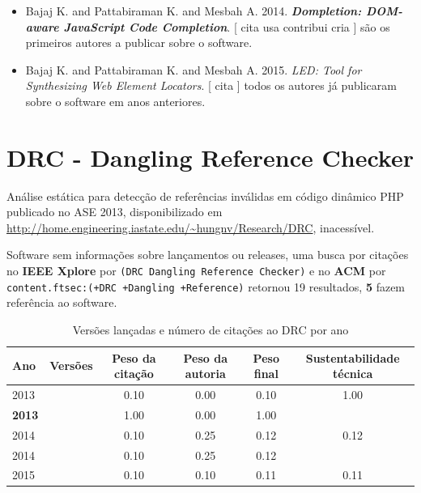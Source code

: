 \begin{itemize}
\item Bajaj K. and Pattabiraman K. and Mesbah A.
      2014.
        \textbf{\textit{ Dompletion: DOM-aware JavaScript Code Completion}}.
      [
          cita
          usa
          contribui
          cria
      ]
são os primeiros autores a publicar sobre o software.
\item Bajaj K. and Pattabiraman K. and Mesbah A.
      2015.
        \textit{ LED: Tool for Synthesizing Web Element Locators}.
      [
          cita
      ]
todos os autores já publicaram sobre o software em anos anteriores.
\end{itemize}
\section{DRC - Dangling Reference Checker}

Análise estática para detecção de referências inválidas em código dinâmico PHP
publicado no ASE 2013,
disponibilizado em \url{http://home.engineering.iastate.edu/~hungnv/Research/DRC},
inacessível.

Software sem informações sobre lançamentos ou releases,
uma busca por citações no {\bf IEEE Xplore} por
\texttt{(DRC Dangling Reference Checker)}
e no {\bf ACM} por
\texttt{content.ftsec:(+DRC +Dangling +Reference)}
retornou
19 resultados,
{\bf 5} fazem referência ao software.


\begin{table}[H]
\caption{Versões lançadas e número de citações ao DRC por ano}
\centering
\begin{tabular}{| l | c | c | c | c | c |}
  \hline
  Ano & Versões & Peso da citação & Peso da autoria & Peso final & Sustentabilidade técnica \\
  \hline
            2013
          &
          
          &
          0.10
          &
          0.00
          &
          0.10
          &
            {\color{blue} 1.00}
          \\
            {\bf 2013}
          &
          
          &
          1.00
          &
          0.00
          &
          1.00
          &
          \\
\hline
            2014
          &
          
          &
          0.10
          &
          0.25
          &
          0.12
          &
            {\color{red} 0.12}
          \\
            2014
          &
          
          &
          0.10
          &
          0.25
          &
          0.12
          &
          \\
\hline
            2015
          &
          
          &
          0.10
          &
          0.10
          &
          0.11
          &
            {\color{red} 0.11}
          \\
\hline
\end{tabular}
\end{table}

